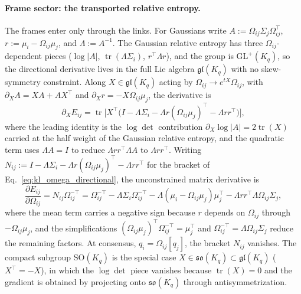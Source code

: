 \documentclass[11pt]{article}
\begin{document}
\paragraph{Frame sector: the transported relative entropy.}
The frames enter only through the links. For Gaussians write $A := \Omega_{ij}\Sigma_j\Omega_{ij}^\top$, $r := \mu_i - \Omega_{ij}\mu_j$, and $\Lambda := A^{-1}$. The Gaussian relative entropy has three $\Omega_{ij}$-dependent pieces ($\log|A|$, $\operatorname{tr}(\Lambda\Sigma_i)$, $r^\top\Lambda r$), and the group is $\mathrm{GL}^+(K_q)$, so the directional derivative lives in the full Lie algebra $\mathfrak{gl}(K_q)$ with no skew-symmetry constraint. Along $X \in \mathfrak{gl}(K_q)$ acting by $\Omega_{ij} \to e^{tX}\Omega_{ij}$, with $\partial_X A = XA + AX^\top$ and $\partial_X r = -X\Omega_{ij}\mu_j$, the derivative is
\begin{equation}
\partial_X E_{ij} = \operatorname{tr}\Big[X^\top\Big(I - \Lambda\Sigma_i - \Lambda r(\Omega_{ij}\mu_j)^\top - \Lambda r r^\top\Big)\Big],
\label{eq:kl_omega_directional}
\end{equation}
where the leading identity is the $\log\det$ contribution $\partial_X\log|A| = 2\operatorname{tr}(X)$ carried at the half weight of the Gaussian relative entropy, and the quadratic term uses $\Lambda A = I$ to reduce $\Lambda r r^\top\Lambda A$ to $\Lambda r r^\top$. Writing $N_{ij} := I - \Lambda\Sigma_i - \Lambda r(\Omega_{ij}\mu_j)^\top - \Lambda r r^\top$ for the bracket of Eq.~\eqref{eq:kl_omega_directional}, the unconstrained matrix derivative is
\begin{equation}
\frac{\partial E_{ij}}{\partial \Omega_{ij}} = N_{ij}\Omega_{ij}^{-\top} = \Omega_{ij}^{-\top} - \Lambda \Sigma_i \Omega_{ij}^{-\top} - \Lambda(\mu_i - \Omega_{ij}\mu_j)\mu_j^\top - \Lambda r r^\top \Lambda \Omega_{ij}\Sigma_j,
\label{eq:kl_omega_unconstrained}
\end{equation}
where the mean term carries a negative sign because $r$ depends on $\Omega_{ij}$ through $-\Omega_{ij}\mu_j$, and the simplifications $(\Omega_{ij}\mu_j)^\top\Omega_{ij}^{-\top} = \mu_j^\top$ and $\Omega_{ij}^{-\top} = \Lambda\Omega_{ij}\Sigma_j$ reduce the remaining factors. At consensus, $q_i = \Omega_{ij}[q_j]$, the bracket $N_{ij}$ vanishes. The compact subgroup $\mathrm{SO}(K_q)$ is the special case $X \in \mathfrak{so}(K_q) \subset \mathfrak{gl}(K_q)$ ($X^\top = -X$), in which the $\log\det$ piece vanishes because $\operatorname{tr}(X) = 0$ and the gradient is obtained by projecting onto $\mathfrak{so}(K_q)$ through antisymmetrization.
\end{document}
